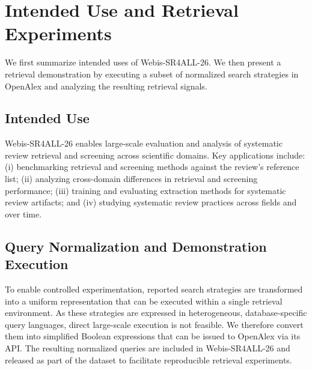 
\section{Intended Use and Retrieval Experiments}
We first summarize intended uses of Webis-SR4ALL-26. We then present a retrieval demonstration by executing a subset of normalized search strategies in OpenAlex and analyzing the resulting retrieval signals.

\subsection{Intended Use}
Webis-SR4ALL-26 enables large-scale evaluation and analysis of systematic review retrieval and screening across scientific domains. Key applications include: 
(i) benchmarking retrieval and screening methods against the review’s reference list; 
(ii) analyzing cross-domain differences in retrieval and screening performance; 
(iii) training and evaluating extraction methods for systematic review artifacts;
and (iv) studying systematic review practices across fields and over time.

\subsection{Query Normalization and Demonstration Execution}
\label{sec:query-norm-demo}
To enable controlled experimentation, reported search strategies are transformed into a uniform representation that can be executed within a single retrieval environment. As these strategies are expressed in heterogeneous, database-specific query languages, direct large-scale execution is not feasible. We therefore convert them into simplified Boolean expressions that can be issued to OpenAlex via its API. The resulting normalized queries are included in Webis-SR4ALL-26 and released as part of the dataset to facilitate reproducible retrieval experiments.

